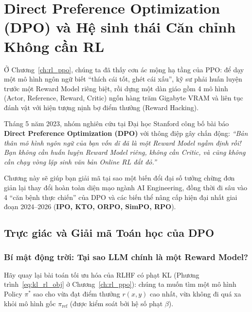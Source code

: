 \chapter{Direct Preference Optimization (DPO) và Hệ sinh thái Căn chỉnh Không cần RL}
\label{ch:dpo}

Ở Chương~\ref{ch:rl_ppo}, chúng ta đã thấy cơn ác mộng hạ tầng của PPO: để dạy một mô hình ngôn ngữ biết ``thích cái tốt, ghét cái xấu'', kỹ sư phải huấn luyện trước một Reward Model riêng biệt, rồi dựng một dàn giáo gồm 4 mô hình (Actor, Reference, Reward, Critic) ngốn hàng trăm Gigabyte VRAM và liên tục đánh vật với hiện tượng nịnh bợ điểm thưởng (Reward Hacking).

Tháng 5 năm 2023, nhóm nghiên cứu tại Đại học Stanford công bố bài báo \textbf{Direct Preference Optimization (DPO)} \citep{rafailov2023direct} với thông điệp gây chấn động: \textit{``Bản thân mô hình ngôn ngữ của bạn vốn dĩ đã là một Reward Model ngầm định rồi! Bạn không cần huấn luyện Reward Model riêng, không cần Critic, và cũng không cần chạy vòng lặp sinh văn bản Online RL đắt đỏ.''}

Chương này sẽ giúp bạn giải mã tại sao một biến đổi đại số tưởng chừng đơn giản lại thay đổi hoàn toàn diện mạo ngành AI Engineering, đồng thời đi sâu vào 4 ``căn bệnh thực chiến'' của DPO và các biến thể nâng cấp hiện đại nhất giai đoạn 2024--2026 (\textbf{IPO, KTO, ORPO, SimPO, RPO}).

\section{Trực giác và Giải mã Toán học của DPO}
\label{sec:dpo_math}

\subsection{Bí mật động trời: Tại sao LLM chính là một Reward Model?}

Hãy quay lại bài toán tối ưu hóa của RLHF có phạt KL (Phương trình~\ref{eq:kl_rl_obj} ở Chương~\ref{ch:rl_ppo}): chúng ta muốn tìm một mô hình Policy $\pi^*$ sao cho vừa đạt điểm thưởng $r(x, y)$ cao nhất, vừa không đi quá xa khỏi mô hình gốc $\pi_{\text{ref}}$ (được kiểm soát bởi hệ số phạt $\beta$).

